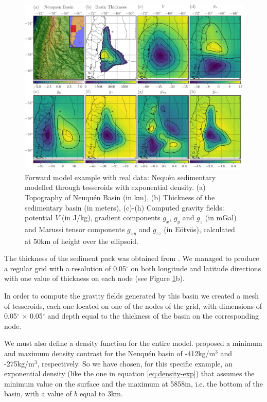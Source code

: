 \documentclass[extra]{gji}
\begin{document}
\begin{figure}
\centering
\includegraphics[width=\linewidth]{figures/neuquen-basin.pdf}
\caption{
         Forward model example with real data: Nequ\'en sedimentary modelled through tesseroids with exponential density.
         (a) Topography of Neuqu\'en Basin (in km),
         (b) Thickness of the sedimentary basin (in meters),
         (c)-(h) Computed gravity fields: potential $V$ (in J/kg), gradient components $g_x$, $g_y$ and $g_z$ (in mGal) and Marussi tensor components $g_{xy}$ and $g_{zz}$ (in Eötvös), calculated at 50km of height over the ellipsoid.}
\label{fig:neuquen-basin}
\end{figure}

The thickness of the sediment pack was obtained from \citet{Heine2007}.
We managed to produce a regular grid with a resolution of 0.05$^\circ$ on both longitude and latitude directions with one value of thickness on each node (see Figure \ref{fig:neuquen-basin}b).

In order to compute the gravity fields generated by this basin we created a mesh of tesseroids, each one located on one of the nodes of the grid, with dimensions of 0.05$^\circ$ $\times$ 0.05$^\circ$ and depth equal to the thickness of the basin on the corresponding node.

We must also define a density function for the entire model.
\citet{Sigismondi2012} proposed a minimum and maximum density contrast for the Neuqu\'en basin of -412kg/m$^3$ and -275kg/m$^3$, respectively. 
So we have chosen, for this specific example, an exponential density (like the one in equation \ref{eq:density-exp}) that assumes the minimum value on the surface and the maximum at 5858m, i.e. the bottom of the basin, with a value of $b$ equal to 3km.
\end{document}
